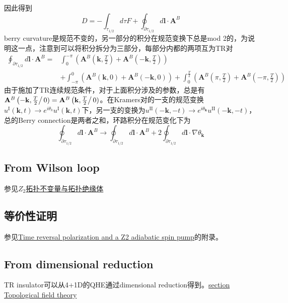 \documentclass[10pt,openany]{book}
\theoremstyle{thmstyle} %
\theoremstyle{defstyle} %
\theoremstyle{prostyle} %
\begin{document}
因此得到
\begin{equation*}
  D=-\int_{\tau_{1 / 2}} d \tau F+\oint_{\partial \tau_{1 / 2}} d \mathbf{l} \cdot \mathbf{A}^B
\end{equation*}
berry curvature是规范不变的，另一部分的积分在规范变换下总是mod 2的，为说明这一点，注意到可以将积分拆分为三部分，每部分内都的两项互为TR对
\begin{equation}
  \begin{aligned}
    \oint_{\partial \tau_{1 / 2}} d \mathbf{l} \cdot \mathbf{A}^B= & \int_0^{-\pi}\left(\mathbf{A}^B\left(\mathbf{k}, \frac{T}{2}\right)+\mathbf{A}^B\left(-\mathbf{k}, \frac{T}{2}\right)\right) \\
    & +\int_{-\pi}^0\left(\mathbf{A}^B(\mathbf{k}, 0)+\mathbf{A}^B(-\mathbf{k}, 0)\right)+\int_0^{\frac{T}{2}}\left(\mathbf{A}^B\left(\pi, \frac{T}{2}\right)+\mathbf{A}^B\left(-\pi, \frac{T}{2}\right)\right)
    \end{aligned}
\end{equation}
由于施加了TR连续规范条件，对于上面积分涉及的参数，总是有$ \mathbf{A}^B\left(-\mathbf{k}, \frac{T}{2}\right/0) =  \mathbf{A}^B\left(\mathbf{k}, \frac{T}{2}\right/0)$。在Kramers对的一支的规范变换$ u^{\mathrm{I}}(\mathbf{k}, t) \rightarrow e^{i \theta_k} u^{\mathrm{I}}(\mathbf{k}, t) $下，另一支的变换为$ u^{\mathrm{II}}(-\mathbf{k},-t) \rightarrow e^{i \theta_{\mathbf{k}}} u^{\mathrm{II}}(-\mathbf{k},-t) $，总的Berry connection是两者之和，环路积分在规范变化下为
\begin{equation}
  \oint_{\partial \tau_{1 / 2}} d \mathbf{l} \cdot \mathbf{A}^B \rightarrow \oint_{\partial \tau_{1 / 2}} d \mathbf{l} \cdot \mathbf{A}^B+2 \oint_{\partial \tau_{1 / 2}} d \mathbf{l} \cdot \nabla \theta_{\mathbf{k}}
\end{equation}
\subsection{From Wilson loop}
参见\href{https://wuli.iphy.ac.cn/cn/article/pdf/preview/32045.pdf}{$ Z_2 $拓扑不变量与拓扑绝缘体 }
\subsection{等价性证明}
参见\href{https://journals.aps.org/prb/pdf/10.1103/PhysRevB.74.195312}{Time reversal polarization and a Z2 adiabatic spin pump}的附录。
\subsection{From dimensional reduction}
TR insulator可以从4+1D的QHE通过dimensional reduction得到。\href{https://journals.aps.org/rmp/pdf/10.1103/RevModPhys.83.1057}{section Topological field theory}
\end{document}
